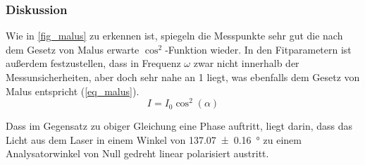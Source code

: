 \documentclass[
	a4paper,
	12pt,
	pagesize,
	ngerman
]{scrartcl}
\begin{document}
			\subsubsection*{Diskussion}

			Wie in \cref{fig_malus} zu erkennen ist, spiegeln die Messpunkte sehr gut die nach dem Gesetz von Malus erwarte $\cos ^2$-Funktion wieder.
			In den Fitparametern ist außerdem festzustellen, dass in Frequenz $\omega$ zwar nicht innerhalb der Messunsicherheiten, aber doch sehr nahe an \num{1} liegt, was ebenfalls dem Gesetz von Malus entspricht (\cref{eq_malus}).
			\begin{equation}
				I = I_0 \cos^2(\alpha)
				\label{eq_malus}
			\end{equation}

			Dass im Gegensatz zu obiger Gleichung eine Phase auftritt, liegt darin, dass das Licht aus dem Laser in einem Winkel von \SI{137,07\pm 0.16}{\degree} zu einem Analysatorwinkel von Null gedreht linear polarisiert austritt.
\end{document}
